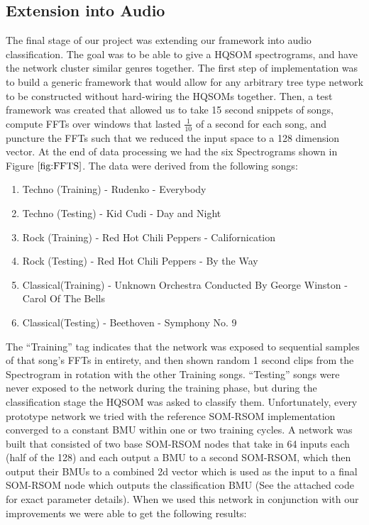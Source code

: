 \documentclass[a4paper,10pt]{article}
\begin{document}
\subsection{Extension into Audio}
The final stage of our project was extending our framework into audio classification.  The goal was
to be able to give a HQSOM spectrograms, and have the network cluster similar genres together. 
The first step of implementation was to build a generic framework that would allow for any arbitrary
tree type network to be constructed without hard-wiring the HQSOMs together.  Then, a test
framework was created that allowed us to take 15 second snippets of songs, compute FFTs over windows
that lasted $\frac{1}{10}$ of a second for each song, and puncture the FFTs such that we reduced the
input space to a 128 dimension vector.  At the end of data processing we had the six Spectrograms
shown in Figure $\ref{fig:FFTS}$. The data were derived from the following songs:
\begin{enumerate}
 \item Techno (Training) - Rudenko - Everybody
 \item Techno (Testing) - Kid Cudi - Day and Night
 \item Rock (Training) - Red Hot Chili Peppers - Californication
 \item Rock (Testing) - Red Hot Chili Peppers - By the Way
 \item Classical(Training) - Unknown Orchestra Conducted By George Winston - Carol Of The Bells
 \item Classical(Testing) - Beethoven - Symphony No. 9
\end{enumerate}
The ``Training'' tag indicates that the network was exposed to sequential samples of that song's
FFTs in entirety, and then shown random 1 second clips from the Spectrogram in rotation with the
other Training songs. ``Testing'' songs were never exposed to the network during the training
phase, but during the classification stage the HQSOM was asked to classify them. Unfortunately,
every prototype network we tried with the reference SOM-RSOM implementation converged to a constant
BMU within one or two training cycles. A network was built that consisted of two base SOM-RSOM
nodes that take in 64 inputs each (half of the 128) and each output a BMU to a second SOM-RSOM,
which then output their BMUs to a combined 2d vector which is used as the input to a final SOM-RSOM
node which outputs the classification BMU (See the attached code for exact parameter details).  When
we used this network in conjunction with our improvements we were able to get the following results:
\end{document}
